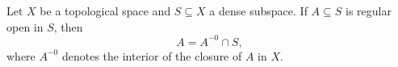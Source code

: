 Let $X$ be a topological space and $S \subseteq X$ a dense subspace. If $A \subseteq S$ is regular open in $S$, then
$$A = A^{-0} \cap S,$$
where $A^{-0}$ denotes the interior of the closure of $A$ in $X$.
